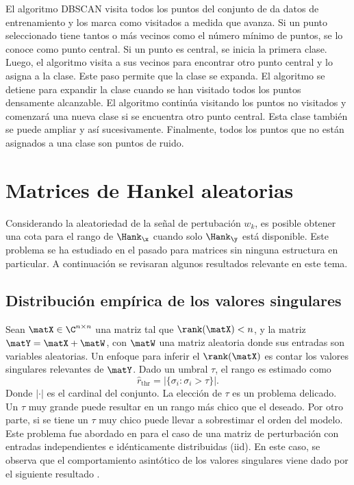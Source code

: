 El algoritmo DBSCAN visita todos los puntos del conjunto de da datos de entrenamiento y los marca como visitados a medida que avanza. Si un punto seleccionado tiene tantos o más vecinos como el número mínimo de puntos, se lo conoce como punto central. Si un punto es central, se inicia la primera clase. Luego, el algoritmo visita a sus vecinos para encontrar otro punto central y lo asigna a la clase. Este paso permite que la clase se expanda. El algoritmo se detiene para expandir la clase cuando se han visitado todos los puntos densamente alcanzable. El algoritmo continúa visitando los puntos no visitados y comenzará una nueva clase si se encuentra otro punto central. Esta clase también se puede ampliar y así sucesivamente. Finalmente, todos los puntos que no están asignados a una clase son puntos de ruido.


\section{Matrices de Hankel aleatorias}\label{sec:RandomHankel}

Considerando la aleatoriedad de la señal de pertubación $w_k$, es posible obtener una cota para el rango de $\Hank_{\x}$ cuando solo $\Hank_{\y}$ está disponible. Este problema se ha estudiado en el pasado para matrices sin ninguna estructura en particular. A continuación se revisaran algunos  resultados relevante en este tema.

\subsection{Distribución empírica de los valores singulares}

Sean $\matX \in\C^{n\times n}$ una matriz tal que $\rank(\matX)<n$, y la matriz $\matY = \matX + \matW$, con $\matW$ una matriz aleatoria donde sus entradas son variables aleatorias. Un enfoque para inferir el $\rank(\matX)$ es contar los valores singulares relevantes de $\matY$. Dado un umbral $\tau$, el rango es estimado como
\begin{equation}
	\hat{r}_{\mathrm{thr}} = \big|\{\sigma_i:\sigma_i>\tau\}\big|.
	\label{Eq:rankThreshold}
\end{equation}
Donde $|\cdot|$ es el cardinal del conjunto. La elección de $\tau$ es un problema delicado. Un $\tau$ muy grande  puede resultar en un rango más chico que el deseado. Por otro parte, si se tiene un $\tau$ muy chico puede llevar a sobrestimar el orden del modelo. Este problema fue abordado en \cite{Gavish2014} para el caso de una matriz de perturbación con entradas independientes e idénticamente distribuidas (iid). En este caso, se observa que el comportamiento asintótico de los valores singulares viene dado por el siguiente resultado \cite{Bai2010}.

